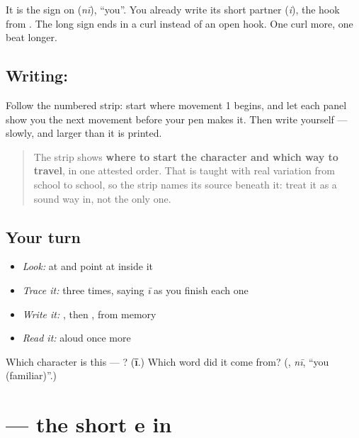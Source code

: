 It is the sign on \textbf{} (\emph{nī}), \textquotedblleft{}you\textquotedblright{}. You already write its short partner  (\emph{i}), the hook from . The long sign  ends in a curl instead of an open hook. One curl more, one beat longer.

\subsection*{Writing: }

Follow the numbered strip: start where movement 1 begins, and let each panel show you the next movement before your pen makes it. Then write  yourself — slowly, and larger than it is printed.

\begin{quote}
The strip shows \textbf{where to start the character and which way to travel}, in one attested order. That is taught with real variation from school to school, so the strip names its source beneath it: treat it as a sound way in, not the only one.
\end{quote}

\subsection*{Your turn}
\begin{itemize}
\raggedright
  \item \emph{Look:} at \textbf{} and point at  inside it
  \item \emph{Trace it:}  three times, saying \emph{ī} as you finish each one
  \item \emph{Write it:} , then , from memory
  \item \emph{Read it:} \textbf{} aloud once more
\end{itemize}

\begin{tcolorbox}[breakable,colback=teal!4,colframe=teal!35!black,title={Before you move on}]
Which character is this — ? (\textbf{ī}.) Which word did it come from? (\textbf{}, \emph{nī}, \textquotedblleft{}you (familiar)\textquotedblright{}.)
\end{tcolorbox}
\section[\texorpdfstring{\ta{ெ} (e)}{ெ (e)}]{ — the short e in }


